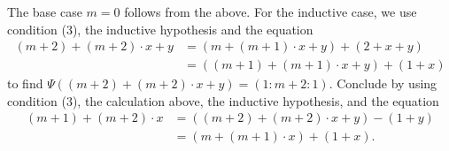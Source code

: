 \documentclass[12pt]{amsart}
\begin{document}
The base case $m = 0$ follows from the above.
For the inductive case, we use condition (3), the inductive hypothesis and the equation
\begin{align*}
  (m+2)+(m+2) \cdot x + y &= (m+(m+1) \cdot x + y)+(2+x+y)  \\
                          &= ((m+1)+(m+1) \cdot x + y) + (1+x)
\end{align*}
to find $\Psi((m+2)+(m+2) \cdot x + y) = (1:m+2:1)$.
Conclude by using condition (3), the calculation above, the inductive hypothesis, and the equation
\begin{align*}
  (m+1) + (m+2) \cdot x &= ((m+2)+(m+2) \cdot x + y) - (1+y) \\
                        &= (m + (m+1) \cdot x) + (1 + x).
\end{align*}



\end{document}
